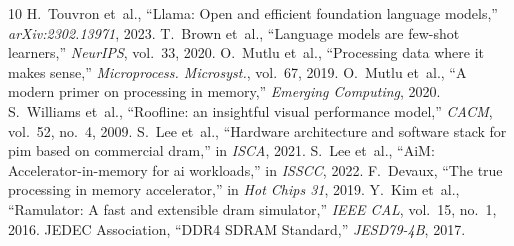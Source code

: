 \documentclass[10pt,twocolumn]{article}
\begin{document}
\begin{thebibliography}{10}
 H.~Touvron et~al., ``Llama: Open and efficient foundation language models,'' \emph{arXiv:2302.13971}, 2023.
 T.~Brown et~al., ``Language models are few-shot learners,'' \emph{NeurIPS}, vol.~33, 2020.
 O.~Mutlu et~al., ``Processing data where it makes sense,'' \emph{Microprocess. Microsyst.}, vol.~67, 2019.
 O.~Mutlu et~al., ``A modern primer on processing in memory,'' \emph{Emerging Computing}, 2020.
 S.~Williams et~al., ``Roofline: an insightful visual performance model,'' \emph{CACM}, vol.~52, no.~4, 2009.
 S.~Lee et~al., ``Hardware architecture and software stack for pim based on commercial dram,'' in \emph{ISCA}, 2021.
 S.~Lee et~al., ``AiM: Accelerator-in-memory for ai workloads,'' in \emph{ISSCC}, 2022.
 F.~Devaux, ``The true processing in memory accelerator,'' in \emph{Hot Chips 31}, 2019.
 Y.~Kim et~al., ``Ramulator: A fast and extensible dram simulator,'' \emph{IEEE CAL}, vol.~15, no.~1, 2016.
 JEDEC Association, ``DDR4 SDRAM Standard,'' \emph{JESD79-4B}, 2017.
\end{thebibliography}
\end{document}
